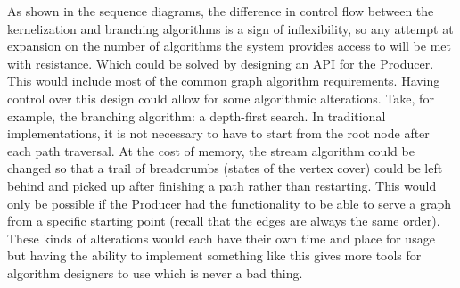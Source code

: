 As shown in the sequence diagrams, the difference in control flow between the
kernelization and branching algorithms is a sign of inflexibility, so any
attempt at expansion on the number of algorithms the system provides access to
will be met with resistance. Which could be solved by designing an API for the
Producer. This would include most of the common graph algorithm requirements.
Having control over this design could allow for some algorithmic alterations.
Take, for example, the branching algorithm: a depth-first search. In
traditional implementations, it is not necessary to have to start from the root
node after each path traversal. At the cost of memory, the stream algorithm
could be changed so that a trail of breadcrumbs (states of the vertex cover)
could be left behind and picked up after finishing a path rather than
restarting. This would only be possible if the Producer had the functionality
to be able to serve a graph from a specific starting point (recall that the
edges are always the same order). These kinds of alterations would each have
their own time and place for usage but having the ability to implement
something like this gives more tools for algorithm designers to use which is
never a bad thing.
